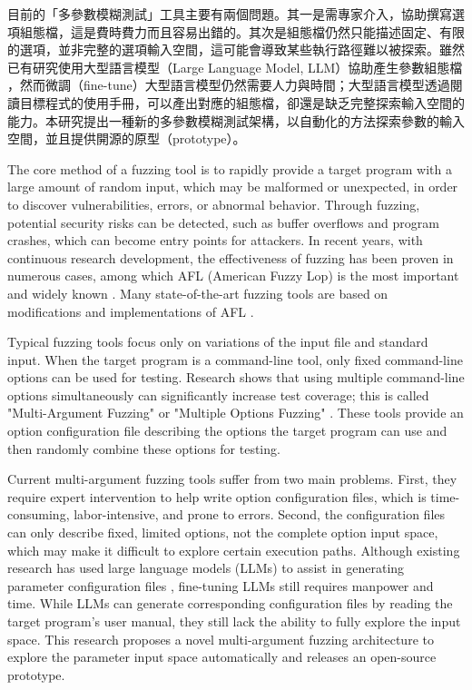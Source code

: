 目前的「多參數模糊測試」工具主要有兩個問題。其一是需專家介入，協助撰寫選項組態檔，這是費時費力而且容易出錯的。其次是組態檔仍然只能描述固定、有限的選項，並非完整的選項輸入空間，這可能會導致某些執行路徑難以被探索。雖然已有研究使用大型語言模型（Large Language Model, LLM）協助產生參數組態檔 \cite{tsai2024Multiple}，然而微調（fine-tune）大型語言模型仍然需要人力與時間；大型語言模型透過閱讀目標程式的使用手冊，可以產出對應的組態檔，卻還是缺乏完整探索輸入空間的能力。本研究提出一種新的多參數模糊測試架構，以自動化的方法探索參數的輸入空間，並且提供開源的原型（prototype）。

\else
The core method of a fuzzing tool is to rapidly provide a target program with a large amount of random input, which may be malformed or unexpected, in order to discover vulnerabilities, errors, or abnormal behavior. Through fuzzing, potential security risks can be detected, such as buffer overflows and program crashes, which can become entry points for attackers. In recent years, with continuous research development, the effectiveness of fuzzing has been proven in numerous cases, among which AFL (American Fuzzy Lop) is the most important and widely known \cite{zalewski2017afl}. Many state-of-the-art fuzzing tools are based on modifications and implementations of AFL \cite{fioraldi2020afl++, pham2019smart, bohme2017directed}.

Typical fuzzing tools focus only on variations of the input file and standard input. When the target program is a command-line tool, only fixed command-line options can be used for testing. Research shows that using multiple command-line options simultaneously can significantly increase test coverage; this is called "Multi-Argument Fuzzing" or "Multiple Options Fuzzing"  \cite{wu2020sq,tseng2023wei,lu2022guan,tsai2024Multiple}. These tools provide an option configuration file describing the options the target program can use and then randomly combine these options for testing.

Current multi-argument fuzzing tools suffer from two main problems. First, they require expert intervention to help write option configuration files, which is time-consuming, labor-intensive, and prone to errors. Second, the configuration files can only describe fixed, limited options, not the complete option input space, which may make it difficult to explore certain execution paths. Although existing research has used large language models (LLMs) to assist in generating parameter configuration files \cite{tsai2024Multiple}, fine-tuning LLMs still requires manpower and time. While LLMs can generate corresponding configuration files by reading the target program's user manual, they still lack the ability to fully explore the input space. This research proposes a novel multi-argument fuzzing architecture to explore the parameter input space automatically and releases an open-source prototype.
\fi